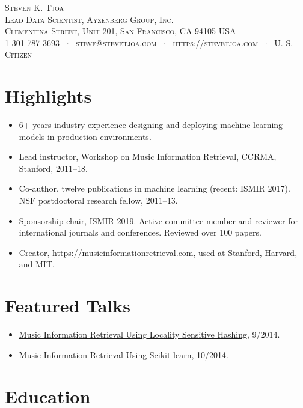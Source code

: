 \documentclass[10pt,letterpaper]{article}
\newcommand{\namestyle}{\huge \scshape}
\newcommand{\addressstyle}{\color{addresscolor} \footnotesize \rmfamily \upshape}
\begin{document}
\begin{center}
    \namestyle Steven K. Tjoa \\[0.2em]
    \addressstyle Lead Data Scientist, Ayzenberg Group, Inc. \\
    \addressstyle 19 Clementina Street, Unit 201, San Francisco, CA 94105 USA \\
    1-301-787-3693 \ $\cdot$ \ steve@stevetjoa.com \ $\cdot$ \ \url{https://stevetjoa.com} \ $\cdot$ \ U. S. Citizen
\end{center}


\small
\section*{Highlights}

\begin{itemize}
    \item 6+ years industry experience designing and deploying machine learning models in production environments.
    \item Lead instructor, Workshop on Music Information Retrieval, CCRMA, Stanford, 2011--18.
    \item Co-author, twelve publications in machine learning (recent: ISMIR 2017). NSF postdoctoral research fellow, 2011--13. 
    \item Sponsorship chair, ISMIR 2019. Active committee member and reviewer for international journals and conferences. Reviewed over 100 papers.
    \item Creator, \url{https://musicinformationretrieval.com}, used at Stanford, Harvard, and MIT.
\end{itemize}


\section*{Featured Talks}

\begin{itemize}
    \item \href{https://youtu.be/SghMq1xBJPI}{Music Information Retrieval Using Locality Sensitive Hashing}, 9/2014. 
    \item \href{https://youtu.be/oGGVvTgHMHw}{Music Information Retrieval Using Scikit-learn}, 10/2014. 
\end{itemize}

\section*{Education}
\end{document}
